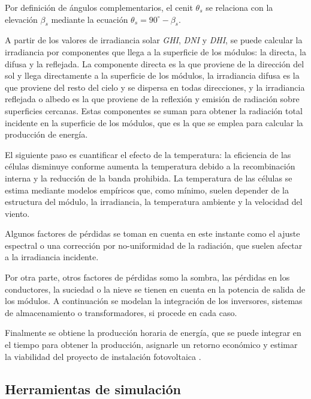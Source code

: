 Por definición de \gls{ángulos complementarios}, el \gls{cenit} $\theta_s$ se relaciona con la elevación $\beta_s$ mediante la ecuación $\theta_s = 90^\circ - \beta_s$.

A partir de los valores de irradiancia solar \textit{\gls{GHI}}, \textit{\gls{DNI}} y \textit{\gls{DHI}}, se puede calcular la irradiancia por componentes que llega a la superficie de los módulos: la \gls{directa}, la \gls{difusa} y la \gls{reflejada}. La componente directa es la que proviene de la dirección del sol y llega directamente a la superficie de los módulos, la irradiancia difusa es la que proviene del resto del cielo y se dispersa en todas direcciones, y la irradiancia reflejada o \gls{albedo} es la que proviene de la reflexión y emisión de radiación sobre superficies cercanas. Estas componentes se suman para obtener la radiación total incidente en la superficie de los módulos, que es la que se emplea para calcular la producción de energía.

El siguiente paso es cuantificar el efecto de la temperatura: la eficiencia de las células disminuye conforme aumenta la temperatura debido a la \gls{recombinación interna} y la reducción de la \gls{banda prohibida}. La temperatura de las células se estima mediante modelos empíricos que, como mínimo, suelen depender de la estructura del \gls{módulo}, la irradiancia, la temperatura ambiente y la velocidad del viento.

Algunos factores de pérdidas se toman en cuenta en este instante como el \gls{ajuste espectral} o una corrección por no-uniformidad de la radiación, que suelen afectar a la irradiancia incidente.

Por otra parte, otros factores de pérdidas somo la \gls{sombra}, las pérdidas en los conductores, la suciedad o la nieve se tienen en cuenta en la potencia de salida de los módulos. A continuación se modelan la integración de los \gls{inversores}, \gls{sistemas de almacenamiento} o \gls{transformadores}, si procede en cada caso.

Finalmente se obtiene la producción horaria de energía, que se puede integrar en el tiempo para obtener la producción, asignarle un retorno económico y estimar la viabilidad del proyecto de instalación fotovoltaica \cite{Rosa-Clot_Tina_2020}.

\subsection{Herramientas de simulación}

